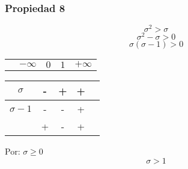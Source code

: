 \documentclass[12pt, letterpaper]{article}
\begin{document}
            \subsubsection{Propiedad 8}
                \[\sigma^2>\sigma \]
                \[\sigma^2-\sigma>0 \]
                \[\sigma(\sigma-1)>0 \]
                \begin{center}
                    \begin{tabular}{ccccc}
                        \phantom{ppp}  & $-\infty$ & $0$ & $1$ & $+\infty$ \\
                    \end{tabular}

                    \begin{tabular}{|c|c|c|c|c|} 
                         \hline
                        $\sigma$ & - & + & + \\ 
                        \hline
                        $\sigma-1$ & - & - & + \\ 
                        \hline 
                         & + &- & + \\
                        \hline                        
                    \end{tabular}
                \end{center}

                Por: $\sigma\ge0$
                \[\sigma>1\]
                \newpage

    \section{}

\end{document}
